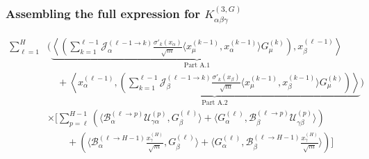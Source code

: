 \documentclass[11pt,a4paper]{article}
\theoremstyle{definition}
\begin{document}
\newpage

\subsubsection{Assembling the full expression for $K^{(3, G)}_{\alpha\beta\gamma}$}

\begin{align}
    \sum_{\ell=1}^{H} & \Biggl( \underbrace{\left\langle \left( \sum_{k=1}^{\ell-1} \mathcal{J}^{(\ell-1 \to k)}_{\alpha} \frac{\sigma'_{k}(x_\alpha)}{\sqrt{m}} \langle x^{(k-1)}_\mu, x^{(k-1)}_\alpha \rangle G^{(k)}_\mu \right), x^{(\ell-1)}_\beta \right\rangle}_{\text{Part A.1}} \nonumber \\
    & \quad + \underbrace{\left\langle x^{(\ell-1)}_\alpha, \left( \sum_{k=1}^{\ell-1} \mathcal{J}^{(\ell-1 \to k)}_{\beta} \frac{\sigma'_{k}(x_\beta)}{\sqrt{m}} \langle x^{(k-1)}_\mu, x^{(k-1)}_\beta \rangle G^{(k)}_\mu \right) \right\rangle}_{\text{Part A.2}} \Biggr) \nonumber \\
    & \times \Biggl[ \sum_{p=\ell}^{H-1} \left( \langle \mathcal{B}^{(\ell \to p)}_{\alpha} \mathcal{U}^{(p)}_{\gamma\alpha}, G^{(\ell)}_\beta \rangle + \langle G^{(\ell)}_\alpha, \mathcal{B}^{(\ell \to p)}_{\beta} \mathcal{U}^{(p)}_{\gamma\beta} \rangle \right) \nonumber \\
    & \qquad + \left( \langle \mathcal{B}^{(\ell \to H-1)}_{\alpha} \frac{x^{(H)}_\gamma}{\sqrt{m}}, G^{(\ell)}_\beta \rangle + \langle G^{(\ell)}_\alpha, \mathcal{B}^{(\ell \to H-1)}_{\beta} \frac{x^{(H)}_\gamma}{\sqrt{m}} \rangle \right) \Biggr]
    \end{align}
\end{document}
